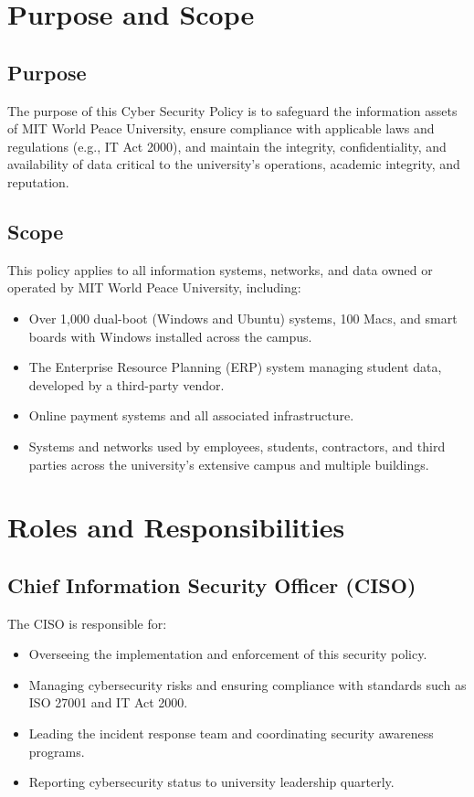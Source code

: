 \documentclass[11pt]{article}
\begin{document}
\tableofcontents
\thispagestyle{empty}
\clearpage

\setcounter{page}{1}
\section{Purpose and Scope}

\subsection{Purpose}
The purpose of this Cyber Security Policy is to safeguard the information assets of MIT World Peace University, ensure compliance with applicable laws and regulations (e.g., IT Act 2000), and maintain the integrity, confidentiality, and availability of data critical to the university’s operations, academic integrity, and reputation.

\subsection{Scope}
This policy applies to all information systems, networks, and data owned or operated by MIT World Peace University, including:
\begin{itemize}
    \item Over 1,000 dual-boot (Windows and Ubuntu) systems, 100 Macs, and smart boards with Windows installed across the campus.
    \item The Enterprise Resource Planning (ERP) system managing student data, developed by a third-party vendor.
    \item Online payment systems and all associated infrastructure.
    \item Systems and networks used by employees, students, contractors, and third parties across the university’s extensive campus and multiple buildings.
\end{itemize}

\section{Roles and Responsibilities}

\subsection{Chief Information Security Officer (CISO)}
The CISO is responsible for:
\begin{itemize}
    \item Overseeing the implementation and enforcement of this security policy.
    \item Managing cybersecurity risks and ensuring compliance with standards such as ISO 27001 and IT Act 2000.
    \item Leading the incident response team and coordinating security awareness programs.
    \item Reporting cybersecurity status to university leadership quarterly.
\end{itemize}
\end{document}
